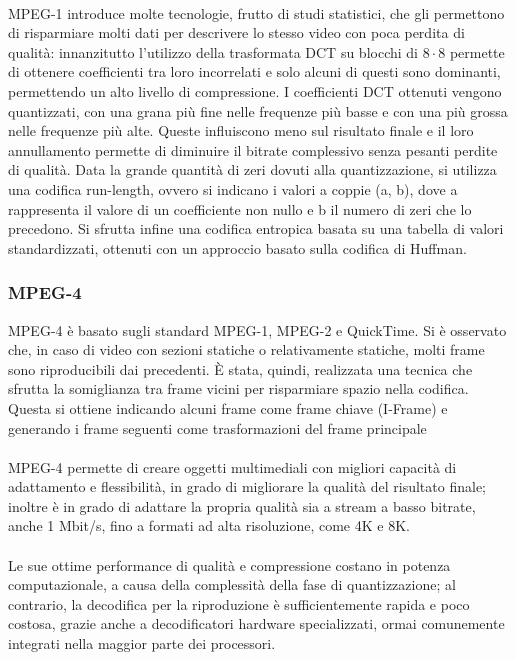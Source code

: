 			\paragraph*{}
			MPEG-1 introduce molte tecnologie, frutto di studi statistici, che gli permettono di risparmiare molti dati per descrivere lo stesso video con poca perdita di qualità: innanzitutto l'utilizzo della \gls{trasformata DCT} su blocchi di \(8\cdot8\) permette di ottenere coefficienti tra loro incorrelati e solo alcuni di questi sono dominanti, permettendo un alto livello di compressione. I coefficienti \gls{DCT} ottenuti vengono quantizzati, con una grana più fine nelle frequenze più basse e con una più grossa nelle frequenze più alte. Queste influiscono meno sul risultato finale e il loro annullamento permette di diminuire il bitrate complessivo senza pesanti perdite di qualità.
			Data la grande quantità di zeri dovuti alla quantizzazione, si utilizza una codifica run-length, ovvero si indicano i valori a coppie (a, b), dove a rappresenta il valore di un coefficiente non nullo e b il numero di zeri che lo precedono. Si sfrutta infine una codifica entropica basata su una tabella di valori standardizzati, ottenuti con un approccio basato sulla codifica di Huffman.

		\subsubsection{MPEG-4}
			MPEG-4 è basato sugli standard MPEG-1, MPEG-2 e QuickTime. Si è osservato che, in caso di video con sezioni statiche o relativamente statiche, molti frame sono riproducibili dai precedenti. È stata, quindi, realizzata una tecnica che sfrutta la somiglianza tra frame vicini per risparmiare spazio nella codifica. Questa si ottiene indicando alcuni frame come frame chiave (I-Frame) e generando i frame seguenti come trasformazioni del frame principale
			\paragraph*{}
			MPEG-4 permette di creare oggetti multimediali con migliori capacità di adattamento e flessibilità, in grado di migliorare la qualità del risultato finale; inoltre è in grado di adattare la propria qualità sia a stream a basso bitrate, anche 1 Mbit/s, fino a formati ad alta risoluzione, come 4K e 8K.
			\paragraph*{}
			Le sue ottime performance di qualità e compressione costano in potenza computazionale, a causa della complessità della fase di quantizzazione; al contrario, la decodifica per la riproduzione è sufficientemente rapida e poco costosa, grazie anche a decodificatori hardware specializzati, ormai comunemente integrati nella maggior parte dei processori.

